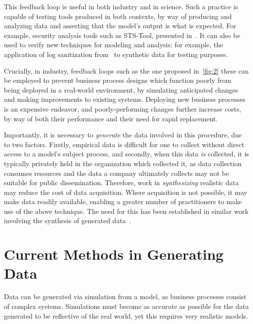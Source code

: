 \documentclass[draft,12pt]{llncs}  %
\begin{document}
This feedback loop is useful in both industry and in science. Such a practice is
capable of testing tools produced in both contexts, by way of producing and
analyzing data and asserting that the model's output is what is expected. For
example, security analysis tools such as STS-Tool, presented
in~\cite{salnitri2015sts}. It can also be used to verify new techniques for
modeling and analysis: for example, the application of log sanitization
from~\cite{cheng2015process} to synthetic data for testing purposes.
\par

Crucially, in industry, feedback loops such as the one proposed in~\cref{fig:2} these can be employed to prevent
business process designs which function poorly from being deployed in a
real-world environment, by simulating anticipated changes and making
improvements to existing systems. Deploying new business processes is an
expensive endeavor, and poorly-performing changes further increase costs, by way
of both their performance and their need for rapid replacement.
\par

Importantly, it is necessary to \emph{generate} the data involved in this
procedure, due to two factors. Firstly, empirical data is difficult for one to
collect without direct access to a model's subject process, and secondly, when
this data \emph{is} collected, it is typically privately held in the
organization which collected it, as data collection consumes resources and the
data a company ultimately collects may not be suitable for public dissemination.
Therefore, work in \emph{synthesizing} realistic data may reduce the cost of
data acquisition. Where acquisition is not possible, it may make data
readily available, enabling a greater number of practitioners to make use of the
above technique. The need for this has been established in similar work
involving the synthesis of generated
data~\citep{accorsi2013secsy,pourmasoumi2015business,mitsyuk2017generating}.
\par


\section{Current Methods in Generating Data}
Data can be generated via simulation from a model, as business processes consist of
complex systems. Simulations must become as
accurate as possible for the data generated to be reflective of the real world,
yet this requires very realistic models.
\par
\end{document}
